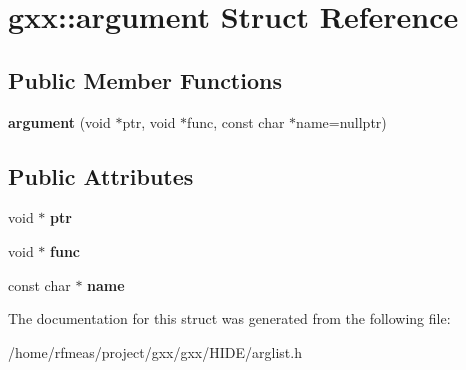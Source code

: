 \hypertarget{structgxx_1_1argument}{}\section{gxx\+:\+:argument Struct Reference}
\label{structgxx_1_1argument}
\subsection*{Public Member Functions}
\begin{DoxyCompactItemize}
\item 
{\bfseries argument} (void $\ast$ptr, void $\ast$func, const char $\ast$name=nullptr)\hypertarget{structgxx_1_1argument_a54267adb8fcd72e7bcc9acc46bb03444}{}\label{structgxx_1_1argument_a54267adb8fcd72e7bcc9acc46bb03444}

\end{DoxyCompactItemize}
\subsection*{Public Attributes}
\begin{DoxyCompactItemize}
\item 
void $\ast$ {\bfseries ptr}\hypertarget{structgxx_1_1argument_acb4b409905e981f89a3e1c74537994a1}{}\label{structgxx_1_1argument_acb4b409905e981f89a3e1c74537994a1}

\item 
void $\ast$ {\bfseries func}\hypertarget{structgxx_1_1argument_a76481d38590569300559e9d66b76dcac}{}\label{structgxx_1_1argument_a76481d38590569300559e9d66b76dcac}

\item 
const char $\ast$ {\bfseries name}\hypertarget{structgxx_1_1argument_a7ce8afbed3d14630bc0aae35bc3ac8f3}{}\label{structgxx_1_1argument_a7ce8afbed3d14630bc0aae35bc3ac8f3}

\end{DoxyCompactItemize}


The documentation for this struct was generated from the following file\+:\begin{DoxyCompactItemize}
\item 
/home/rfmeas/project/gxx/gxx/\+H\+I\+D\+E/arglist.\+h\end{DoxyCompactItemize}
